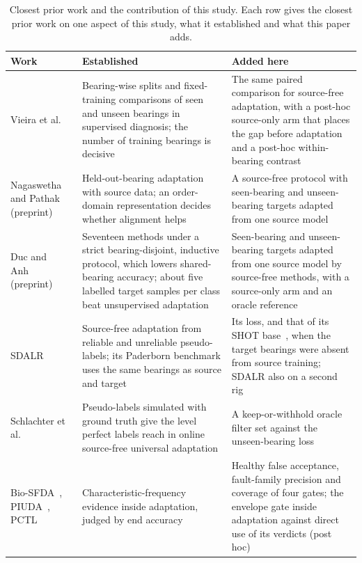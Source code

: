 \begin{table}[htbp]
\centering
\begingroup
\small
\begin{tabular}{>{\raggedright\arraybackslash}p{3.0cm}>{\raggedright\arraybackslash}p{5.1cm}>{\raggedright\arraybackslash}p{5.5cm}}
\toprule
Work & Established & Added here \\
\midrule
Vieira et al.~\cite{vieira2026} & Bearing-wise splits and fixed-training comparisons of seen and unseen bearings in supervised diagnosis; the number of training bearings is decisive & The same paired comparison for source-free adaptation, with a post-hoc source-only arm that places the gap before adaptation and a post-hoc within-bearing contrast \\
\addlinespace
Nagaswetha and Pathak~\cite{nagaswetha2026} (preprint) & Held-out-bearing adaptation with source data; an order-domain representation decides whether alignment helps & A source-free protocol with seen-bearing and unseen-bearing targets adapted from one source model \\
\addlinespace
Duc and Anh~\cite{duc2026recipe} (preprint) & Seventeen methods under a strict bearing-disjoint, inductive protocol, which lowers shared-bearing accuracy; about five labelled target samples per class beat unsupervised adaptation & Seen-bearing and unseen-bearing targets adapted from one source model by source-free methods, with a source-only arm and an oracle reference \\
\addlinespace
SDALR~\cite{sdalr2025} & Source-free adaptation from reliable and unreliable pseudo-labels; its Paderborn benchmark uses the same bearings as source and target & Its loss, and that of its SHOT base~\cite{liang2020shot}, when the target bearings were absent from source training; SDALR also on a second rig \\
\addlinespace
Schlachter et al.~\cite{schlachter2025} & Pseudo-labels simulated with ground truth give the level perfect labels reach in online source-free universal adaptation & A keep-or-withhold oracle filter set against the unseen-bearing loss \\
\addlinespace
Bio-SFDA~\cite{yoon2026biosfda}, PIUDA~\cite{jia2024piuda}, PCTL~\cite{pctl2026} & Characteristic-frequency evidence inside adaptation, judged by end accuracy & Healthy false acceptance, fault-family precision and coverage of four gates; the envelope gate inside adaptation against direct use of its verdicts (post hoc) \\
\bottomrule
\end{tabular}\par
\endgroup
\caption{Closest prior work and the contribution of this study. Each row gives the closest prior work on one aspect of this study, what it established and what this paper adds.}
\label{tab:positioning}
\end{table}

